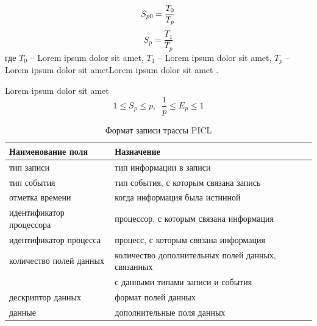 \begin{equation}
S_{p0}=\frac{T_{0} }{T_{p}} \\
\label{F:100}
\end{equation}
\begin{equation}
S_{p}=\frac{T_{1} }{T_{p}}
\label{F:101}
\end{equation}
где $T_{0}$ -- Lorem ipsum dolor sit amet, $T_{1}$ -- Lorem ipsum dolor sit amet, $T_{p}$ -- Lorem ipsum dolor sit ametLorem ipsum dolor sit amet \cite{b1}. 

Lorem ipsum dolor sit amet
\begin{equation}
1\leq S_{p} \leq p,\; \;  \frac{1}{p} \leq E_{p} \leq 1
\label{F:103}
\end{equation}



\begin{table}[h!]
	\caption{\label{tab:tbl1}Формат записи трассы PICL}
	\begin{tabular}{|l|l|}
		\hline
		Наименование поля & Назначение \\
		\hline\hline
		тип записи&тип информации в записи
		\\\hline
		тип события &тип события, с которым связана запись
		\\\hline
		отметка времени&когда информация была истинной\\\hline
		идентификатор процессора
		&процессор, с которым связана информация
		\\\hline
		идентификатор процесса	
		&процесс, с которым связана информация	
		\\\hline
		количество полей данных	
		&количество дополнительных полей данных, связанных \tabularnewline & с данными типами записи и события	
		\\\hline
		дескриптор данных	
		&формат полей данных
		\\\hline
		данные	
		&дополнительные поля данных
		\\\hline
		
	\end{tabular}
\end{table}

